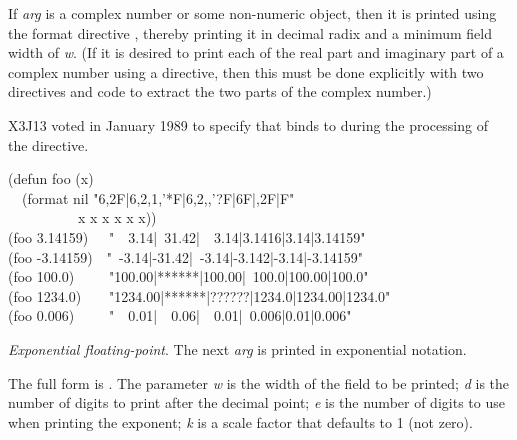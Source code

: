 \begin{flushdesc}
If \emph{arg} is a complex number or some non-numeric
object, then it is printed using the format directive ,
thereby printing it in decimal radix and a minimum field width of \emph{w}.
(If it is desired to print each of the real part and imaginary part
of a complex number using a  directive, then this must
be done explicitly with two  directives and code to
extract the two parts of the complex number.)

\begin{new}
X3J13 voted in January 1989
to specify that  binds  to 
during the processing of the  directive.
\end{new}

\begin{lisp}
(defun foo (x) \\
~~(format nil "{\Xtilde}6,2F|{\Xtilde}6,2,1,'*F|{\Xtilde}6,2,,'?F|{\Xtilde}6F|{\Xtilde},2F|{\Xtilde}F" \\
~~~~~~~~~~x x x x x x)) \\
(foo 3.14159)~~\EV\ "~~3.14|~31.42|~~3.14|3.1416|3.14|3.14159" \\
(foo -3.14159)~\EV\ "~-3.14|-31.42|~-3.14|-3.142|-3.14|-3.14159" \\
(foo 100.0)~~~~\EV\ "100.00|******|100.00|~100.0|100.00|100.0" \\
(foo 1234.0)~~~\EV\ "1234.00|******|??????|1234.0|1234.00|1234.0" \\
(foo 0.006)~~~~\EV\ "~~0.01|~~0.06|~~0.01|~0.006|0.01|0.006"
\end{lisp}

\item[\cd{{\Xtilde}E}]
\emph{Exponential floating-point}.
The next \emph{arg} is printed in exponential notation.

The full form is .
The parameter \emph{w}
is the width of the field to be printed; \emph{d} is the number
of digits to print after the decimal point; \emph{e} is the number
of digits to use when printing the exponent;
\emph{k} is a scale factor that defaults to 1 (not zero).


\end{flushdesc}
